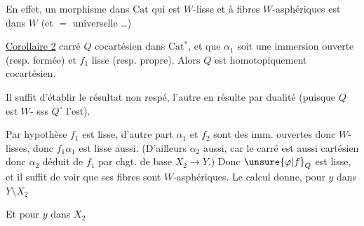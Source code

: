 En effet, un morphisme dans $\mathrm{Cat}$ qui est $W$-lisse et à fibres $W$-asphériques est dans $W$ (et $=$  universelle \ldots)

\uline{Corollaire 2}   carré $Q$ cocartésien dans $\mathrm{Cat}$${}^{*}$, et que $\alpha_1$ soit une immersion ouverte (resp. fermée) et $f_1$ lisse (resp. propre). Alors $Q$ est homotopiquement cocartésien.



Il suffit d'établir le résultat non respé, l'autre en résulte par dualité (puisque $Q$ est $W$- sss $Q^\circ$ l'est).

Par hypothèse $f_1$ est lisse, d'autre part $\alpha_1$ et $f_2$ sont des imm. ouvertes donc $W$-lisses, donc $f_1\alpha_1$ est lisse aussi. (D'ailleurs $\alpha_2$ aussi, car le carré est aussi cartésien donc $\alpha_2$ déduit de $f_1$  par chgt. de base $X_2\to Y$.) Donc $\unsure{\varphi|f}_Q$ est lisse, et il suffit de voir que ses fibres sont $W$-asphériques. Le calcul  donne, pour $y$ dans $Y\setminus X_2$


Et pour $y$ dans $X_2$

